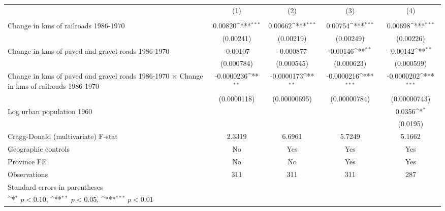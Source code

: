 {
\def\sym#1{\ifmmode^{#1}\else\(^{#1}\)\fi}
\begin{tabular}{l*{4}{c}}
\hline\hline
                &\multicolumn{1}{c}{(1)}&\multicolumn{1}{c}{(2)}&\multicolumn{1}{c}{(3)}&\multicolumn{1}{c}{(4)}\\
                &\multicolumn{1}{c}{}&\multicolumn{1}{c}{}&\multicolumn{1}{c}{}&\multicolumn{1}{c}{}\\
\hline
Change in kms of railroads 1986-1970&  0.00820\sym{***}&  0.00662\sym{***}&  0.00754\sym{***}&  0.00698\sym{***}\\
                &(0.00241)         &(0.00219)         &(0.00249)         &(0.00226)         \\
[1em]
Change in kms of paved and gravel roads 1986-1970& -0.00107         &-0.000877         & -0.00146\sym{**} & -0.00142\sym{**} \\
                &(0.000784)         &(0.000545)         &(0.000623)         &(0.000599)         \\
[1em]
Change in kms of paved and gravel roads 1986-1970 $\times$ Change in kms of railroads 1986-1970&-0.0000236\sym{**} &-0.0000173\sym{**} &-0.0000216\sym{***}&-0.0000202\sym{***}\\
                &(0.0000118)         &(0.00000695)         &(0.00000784)         &(0.00000743)         \\
[1em]
Log urban population 1960&                  &                  &                  &   0.0356\sym{*}  \\
                &                  &                  &                  & (0.0195)         \\
\hline
Cragg-Donald (multivariate) F-stat&   2.3319         &   6.6961         &   5.7249         &   5.1662         \\
Geographic controls&       No         &      Yes         &      Yes         &      Yes         \\
Province FE     &       No         &       No         &      Yes         &      Yes         \\
Observations    &      311         &      311         &      311         &      287         \\
\hline\hline
\multicolumn{5}{l}{\footnotesize Standard errors in parentheses}\\
\multicolumn{5}{l}{\footnotesize \sym{*} \(p<0.10\), \sym{**} \(p<0.05\), \sym{***} \(p<0.01\)}\\
\end{tabular}
}

